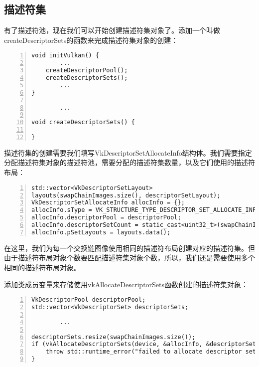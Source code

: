 \documentclass{ctexart}
\begin{document}
\subsection{描述符集}

有了描述符池，现在我们可以开始创建描述符集对象了。添加一个叫做createDescriptorSets的函数来完成描述符集对象的创建：

\begin{lstlisting}[language={[ANSI]C},keywordstyle=\color{blue!70},commentstyle=\color{red!50!green!50!blue!50},frame=shadowbox, rulesepcolor=\color{red!20!green!20!blue!20},basicstyle=\small,numbers=left, numberstyle=\tiny,breaklines=true]
void initVulkan() {
		...
	createDescriptorPool();
	createDescriptorSets();
		...
}

		...

void createDescriptorSets() {

}
\end{lstlisting}

描述符集的创建需要我们填写VkDescriptorSetAllocateInfo结构体。我们需要指定分配描述符集对象的描述符池，需要分配的描述符集数量，以及它们使用的描述符布局：

\begin{lstlisting}[language={[ANSI]C},keywordstyle=\color{blue!70},commentstyle=\color{red!50!green!50!blue!50},frame=shadowbox, rulesepcolor=\color{red!20!green!20!blue!20},basicstyle=\small,numbers=left, numberstyle=\tiny,breaklines=true]
std::vector<VkDescriptorSetLayout>
layouts(swapChainImages.size(), descriptorSetLayout);
VkDescriptorSetAllocateInfo allocInfo = {};
allocInfo.sType = VK_STRUCTURE_TYPE_DESCRIPTOR_SET_ALLOCATE_INFO;
allocInfo.descriptorPool = descriptorPool;
allocInfo.descriptorSetCount = static_cast<uint32_t>(swapChainImages.size());
allocInfo.pSetLayouts = layouts.data();
\end{lstlisting}

在这里，我们为每一个交换链图像使用相同的描述符布局创建对应的描述符集。但由于描述符布局对象个数要匹配描述符集对象个数，所以，我们还是需要使用多个相同的描述符布局对象。

添加类成员变量来存储使用vkAllocateDescriptorSets函数创建的描述符集对象：

\begin{lstlisting}[language={[ANSI]C},keywordstyle=\color{blue!70},commentstyle=\color{red!50!green!50!blue!50},frame=shadowbox, rulesepcolor=\color{red!20!green!20!blue!20},basicstyle=\small,numbers=left, numberstyle=\tiny,breaklines=true]
VkDescriptorPool descriptorPool;
std::vector<VkDescriptorSet> descriptorSets;

		...

descriptorSets.resize(swapChainImages.size());
if (vkAllocateDescriptorSets(device, &allocInfo, &descriptorSets[0]) != VK_SUCCESS) {
	throw std::runtime_error("failed to allocate descriptor sets!");
}
\end{lstlisting}
\end{document}
